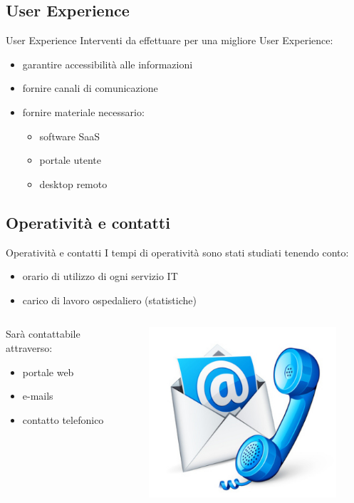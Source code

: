 \subsection*{User Experience}
\begin{frame}{User Experience}
Interventi da effettuare per una migliore User Experience:
\begin{itemize}
\item{garantire accessibilità alle informazioni}
\item{fornire canali di comunicazione}
\item{fornire materiale necessario:}
\begin{itemize}
\item{software SaaS}
\item{portale utente}
\item{desktop remoto}
\end{itemize}
\end{itemize}
\end{frame}

\subsection*{Operatività e contatti}
\begin{frame}{Operatività e contatti}
I tempi di operatività sono stati studiati tenendo conto:
\begin{itemize}
\item{orario di utilizzo di ogni servizio IT}
\item{carico di lavoro ospedaliero (statistiche)}
\end{itemize}
\begin{columns}
\begin{column}{0.7\textwidth}
Sarà contattabile attraverso:
\begin{itemize}
\item{portale web}
\item{e-mails}
\item{contatto telefonico}
\end{itemize}
\end{column}
\begin{column}{0.3\textwidth}
\begin{figure}
\includegraphics[scale=0.2]{Images/Contact.png}
\end{figure}
\end{column}
\end{columns}
\end{frame}

